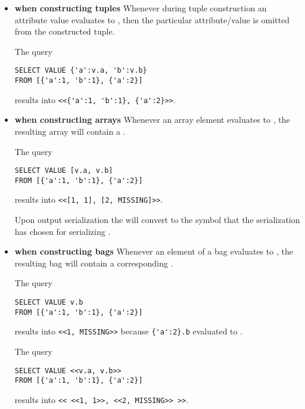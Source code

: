 \begin{itemize}
\item \textbf{when constructing tuples} Whenever during tuple construction an
attribute value evaluates to \MISSING, then the particular attribute/value is
omitted from the constructed tuple.

\begin{example} The query

\begin{lstlisting}
SELECT VALUE {'a':v.a, 'b':v.b}
FROM [{'a':1, 'b':1}, {'a':2}]
\end{lstlisting}

\noindent results into \lstinline|<<{'a':1, 'b':1}, {'a':2}>>|.
\end{example}

\item \textbf{when constructing arrays} Whenever an array element evaluates to
\MISSING, the resulting array will contain a \MISSING.

\begin{example}
The query

\begin{lstlisting}
SELECT VALUE [v.a, v.b]
FROM [{'a':1, 'b':1}, {'a':2}]
\end{lstlisting}

\noindent results into \lstinline|<<[1, 1], [2, MISSING]>>|.
\end{example}

Upon output serialization the \MISSING will convert to the symbol that the
serialization has chosen for serializing \MISSING.

\item \textbf{when constructing bags} Whenever an element of a bag evaluates to
\MISSING, the resulting bag will contain a corresponding \MISSING. 

\begin{example}
The query

\begin{lstlisting}
SELECT VALUE v.b
FROM [{'a':1, 'b':1}, {'a':2}]
\end{lstlisting}

\noindent results into \lstinline|<<1, MISSING>>| because \lstinline|{'a':2}.b|
evaluated to \MISSING.
\end{example}

\begin{example}
The query

\begin{lstlisting}
SELECT VALUE <<v.a, v.b>>
FROM [{'a':1, 'b':1}, {'a':2}]
\end{lstlisting}

\noindent results into \lstinline|<< <<1, 1>>, <<2, MISSING>> >>|.
\end{example}
\end{itemize}

